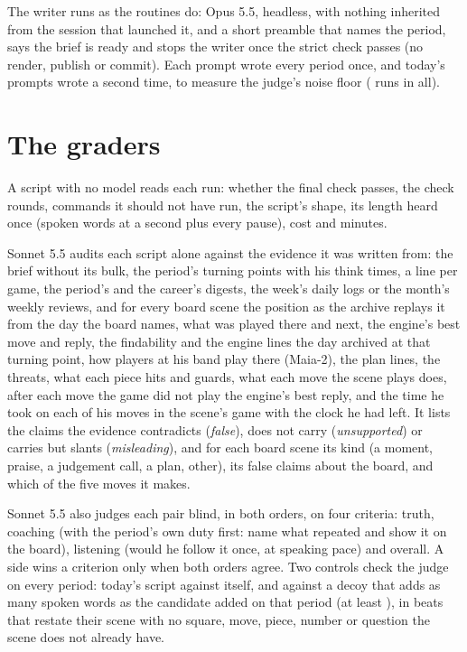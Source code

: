 \documentclass[11pt]{article}
\begin{document}
The writer runs as the routines do: Opus 5.5, headless, with nothing inherited from the session that
launched it, and a short preamble that names the period, says the brief is ready and stops the writer
once the strict check passes (no render, publish or commit). Each prompt wrote every period once, and
today's prompts wrote \NullCases{} a second time, to measure the judge's noise floor (\WriterRuns{}
runs in all).

\section{The graders}

A script with no model reads each run: whether the final check passes, the check rounds, commands it
should not have run, the script's shape, its length heard once (spoken words at \WordsPerSecond{} a
second plus every pause), cost and minutes.

Sonnet 5.5 audits each script alone against the evidence it was written from: the brief without its
bulk, the period's turning points with his think times, a line per game, the period's and the
career's digests, the week's daily logs or the month's weekly reviews, and for every board scene the
position as the archive replays it from the day the board names, what was played there and next, the
engine's best move and reply, the findability and the engine lines the day archived at that turning
point, how players at his band play there (Maia-2), the plan lines, the threats, what each piece hits
and guards, what each move the scene plays does, after each move the game did not play the engine's
best reply, and the time he took on each of his moves in the scene's game with the clock he had left.
It lists the claims the evidence contradicts (\emph{false}), does not carry (\emph{unsupported}) or
carries but slants (\emph{misleading}), and for each board scene its kind (a moment, praise, a
judgement call, a plan, other), its false claims about the board, and which of the five moves it
makes.

Sonnet 5.5 also judges each pair blind, in both orders, on four criteria: truth, coaching (with the
period's own duty first: name what repeated and show it on the board), listening (would he follow it
once, at speaking pace) and overall. A side wins a criterion only when both orders agree. Two
controls check the judge on every period: today's script against itself, and against a decoy that
adds as many spoken words as the candidate added on that period (at least \MinDecoyWords), in beats
that restate their scene with no square, move, piece, number or question the scene does not already
have.
\end{document}
